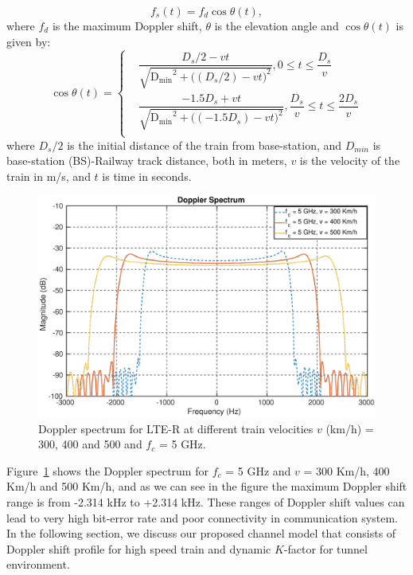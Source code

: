 \begin{equation}
\label{eq1}
f_s(t) = f_d\cos\theta(t),
\end{equation}
where \textrm{$f_d$} is the maximum Doppler shift, $\theta$ is the elevation angle and $\cos \theta(t)$ is given by:
\begin{equation}
\cos\theta(t) = 
\left\{
	\begin{aligned}
	 & \dfrac{D_s/2-vt}{\sqrt{\mathrm{D_{min}}^2+\bigg((D_s/2)-vt\bigg)^2}},0\leq t\leq\dfrac{D_s}{v}\\
	 & \dfrac{-1.5D_s+vt}{\sqrt{\mathrm{D_{min}}^2+\bigg((-1.5D_s)-vt\bigg)^2}},\dfrac{D_s}{v}\leq t \leq \dfrac{2D_s}{v}\\
 	\end{aligned}
\right.
\end{equation}
where $D_s/2$ is the initial distance of the train from base-station, and $D_{min}$ is base-station (BS)-Railway track distance, both in meters, $v$ is the velocity of the train in \textrm{m/s}, and $t$ is time in seconds.

\begin{figure}[!ht]
\centering
\includegraphics[width=\textwidth,keepaspectratio]{images/Gill/lte_figs/dopplerspectrum.eps} 
\caption{Doppler spectrum for LTE-R at different train velocities $v$ (km/h) = 300, 400 and 500 and $f_c$ = 5 GHz.}
\label{doppler}
\end{figure}

Figure~\ref{doppler} shows the Doppler spectrum for $f_c$ = 5 GHz and $v$ = 300 Km/h, 400 Km/h and 500 Km/h, and as we can see in the figure the maximum Doppler shift range is from -2.314 kHz to +2.314 kHz. These ranges of Doppler shift values can lead to very high bit-error rate and poor connectivity in communication system. In the following section, we discuss our proposed channel model that consists of Doppler shift profile for high speed train and dynamic $K$-factor for tunnel environment.

